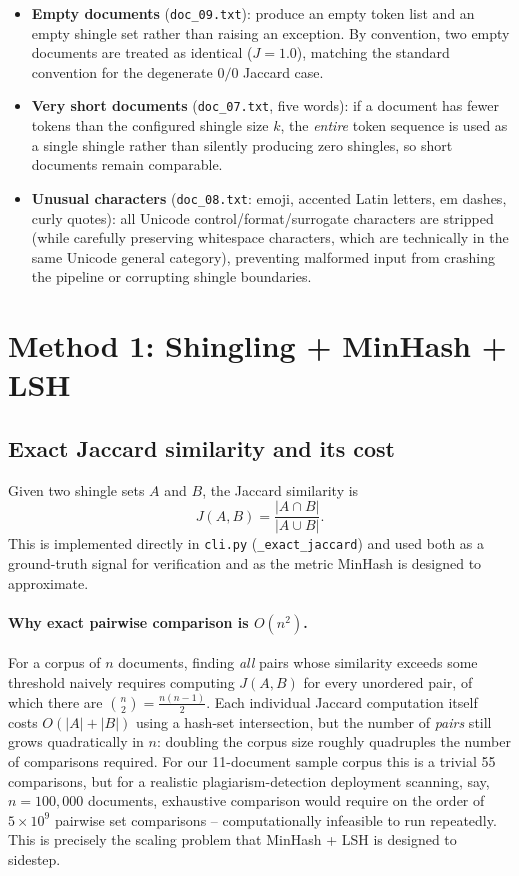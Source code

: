 \documentclass[11pt]{article}
\begin{document}
\begin{itemize}
    \item \textbf{Empty documents} (\verb|doc_09.txt|): produce an empty token list and an empty shingle
          set rather than raising an exception. By convention, two empty documents are treated as
          identical ($J = 1.0$), matching the standard convention for the degenerate $0/0$ Jaccard case.
    \item \textbf{Very short documents} (\verb|doc_07.txt|, five words): if a document has fewer tokens
          than the configured shingle size $k$, the \emph{entire} token sequence is used as a single
          shingle rather than silently producing zero shingles, so short documents remain comparable.
    \item \textbf{Unusual characters} (\verb|doc_08.txt|: emoji, accented Latin letters, em dashes,
          curly quotes): all Unicode control/format/surrogate characters are stripped (while carefully
          preserving whitespace characters, which are technically in the same Unicode general category),
          preventing malformed input from crashing the pipeline or corrupting shingle boundaries.
\end{itemize}

\section{Method 1: Shingling + MinHash + LSH}

\subsection{Exact Jaccard similarity and its cost}

Given two shingle sets $A$ and $B$, the Jaccard similarity is
\[
    J(A, B) = \frac{|A \cap B|}{|A \cup B|}.
\]
This is implemented directly in \verb|cli.py| (\verb|_exact_jaccard|) and used both as a ground-truth
signal for verification and as the metric MinHash is designed to approximate.

\paragraph{Why exact pairwise comparison is $O(n^2)$.} For a corpus of $n$ documents, finding \emph{all}
pairs whose similarity exceeds some threshold naively requires computing $J(A,B)$ for every unordered pair,
of which there are $\binom{n}{2} = \frac{n(n-1)}{2}$. Each individual Jaccard computation itself costs
$O(|A| + |B|)$ using a hash-set intersection, but the number of \emph{pairs} still grows quadratically in
$n$: doubling the corpus size roughly quadruples the number of comparisons required. For our 11-document
sample corpus this is a trivial 55 comparisons, but for a realistic plagiarism-detection deployment
scanning, say, $n = 100{,}000$ documents, exhaustive comparison would require on the order of $5 \times
10^9$ pairwise set comparisons -- computationally infeasible to run repeatedly. This is precisely the
scaling problem that MinHash + LSH is designed to sidestep.
\end{document}
